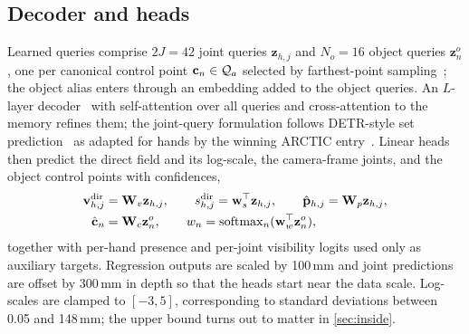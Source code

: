 \subsection{Decoder and heads}
\label{sec:decoder}
Learned queries comprise $2J{=}42$ joint queries $\mathbf{z}_{h,j}$ and $N_o{=}16$ object queries $\mathbf{z}^o_n$, one per canonical control point $\mathbf{c}_n\in\mathcal{Q}_a$ selected by farthest-point sampling~\cite{qi2017pointnetpp}; the object alias enters through an embedding added to the object queries. An $L$-layer decoder~\cite{vaswani2017attention} with self-attention over all queries and cross-attention to the memory refines them; the joint-query formulation follows DETR-style set prediction~\cite{carion2020detr} as adapted for hands by the winning ARCTIC entry~\cite{abouzeid2023jointtransformer}. Linear heads then predict the direct field and its log-scale, the camera-frame joints, and the object control points with confidences,
\begin{align}
  \mathbf{v}^{\text{dir}}_{h,j}&=\mathbf{W}_v\mathbf{z}_{h,j},\qquad s^{\text{dir}}_{h,j}=\mathbf{w}_s^{\top}\mathbf{z}_{h,j},\qquad \hat{\mathbf{p}}_{h,j}=\mathbf{W}_p\mathbf{z}_{h,j},\\
  \hat{\mathbf{c}}_n&=\mathbf{W}_c\mathbf{z}^o_n,\qquad w_n=\mathrm{softmax}_n(\mathbf{w}_w^{\top}\mathbf{z}^o_n),
\end{align}
together with per-hand presence and per-joint visibility logits used only as auxiliary targets. Regression outputs are scaled by 100\,mm and joint predictions are offset by 300\,mm in depth so that the heads start near the data scale. Log-scales are clamped to $[-3,5]$, corresponding to standard deviations between 0.05 and 148\,mm; the upper bound turns out to matter in \cref{sec:inside}.

